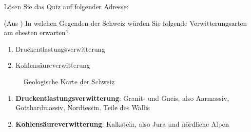 \begin{myexercise}
Lösen Sie das Quiz auf folgender Adresse: 
\end{myexercise}

\begin{mychallenge}
(Aus \cite[133]{westermann}) In welchen Gegenden der Schweiz würden Sie folgende Verwitterungsarten am ehesten erwarten?
\begin{enumerate}
\item Druckentlastungsverwitterung
\item Kohlensäureverwitterung
\end{enumerate}
\begin{figure}[H]
\centering
\caption{Geologische Karte der Schweiz}
\label{fig:geolkarteschweiz}
\end{figure}
\begin{myanswer}
\begin{enumerate}
\item \textbf{Druckentlastungsverwitterung}: Granit- und Gneis, also Aarmassiv, Gotthardmassiv, Nordtessin, Teile des Wallis
\item \textbf{Kohlensäureverwitterung}: Kalkstein, also Jura und nördliche Alpen
\end{enumerate}
\end{myanswer}
\end{mychallenge}